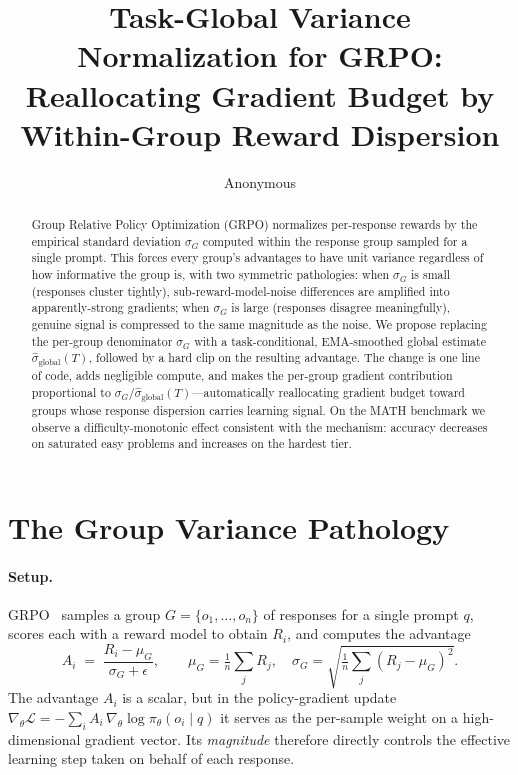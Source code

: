 \documentclass[10pt]{article}
\title{Task-Global Variance Normalization for GRPO:\\
Reallocating Gradient Budget by Within-Group Reward Dispersion}
\author{Anonymous}
\date{}
\begin{document}
\maketitle

\begin{abstract}
Group Relative Policy Optimization (GRPO) normalizes per-response rewards by the
empirical standard deviation $\sigma_G$ computed within the response group sampled
for a single prompt. This forces every group's advantages to have unit variance
regardless of how informative the group is, with two symmetric pathologies: when
$\sigma_G$ is small (responses cluster tightly), sub-reward-model-noise differences
are amplified into apparently-strong gradients; when $\sigma_G$ is large (responses
disagree meaningfully), genuine signal is compressed to the same magnitude as the
noise. We propose replacing the per-group denominator $\sigma_G$ with a
task-conditional, EMA-smoothed global estimate $\hat{\sigma}_{\text{global}}(T)$,
followed by a hard clip on the resulting advantage. The change is one line of code,
adds negligible compute, and makes the per-group gradient contribution proportional
to $\sigma_G / \hat{\sigma}_{\text{global}}(T)$---automatically reallocating
gradient budget toward groups whose response dispersion carries learning signal.
On the MATH benchmark we observe a difficulty-monotonic effect consistent with the
mechanism: accuracy decreases on saturated easy problems and increases on the
hardest tier.
\end{abstract}

\section{The Group Variance Pathology}

\paragraph{Setup.}
GRPO~\citep{shao2024deepseekmath} samples a group $G = \{o_1,\dots,o_n\}$ of
responses for a single prompt $q$, scores each with a reward model to obtain
$R_i$, and computes the advantage
\begin{equation}
A_i \;=\; \frac{R_i - \mu_G}{\sigma_G + \epsilon},
\qquad
\mu_G = \tfrac{1}{n}\sum_j R_j,
\quad
\sigma_G = \sqrt{\tfrac{1}{n}\sum_j (R_j - \mu_G)^2}.
\label{eq:grpo}
\end{equation}
The advantage $A_i$ is a scalar, but in the policy-gradient update
$\nabla_\theta\mathcal{L} = -\sum_i A_i\,\nabla_\theta\log\pi_\theta(o_i\!\mid\!q)$
it serves as the per-sample weight on a high-dimensional gradient vector. Its
\emph{magnitude} therefore directly controls the effective learning step taken on
behalf of each response.
\end{document}
